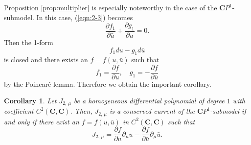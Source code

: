\documentclass[makeidx,12pt,openany]{report}
\newtheorem{cor}[df]{Corollary}
\begin{document}
Proposition \ref{prop:multiplier} is especially noteworthy 
in the case of the ${\mathbf{C}}P^1$-submodel. In this case, 
(\ref{eqn:2-3}) becomes 
$$
 \frac{\partial f_1}{\partial \bar{u}}+\frac{\partial g_1}{\partial u}=0. 
$$
Then the 1-form 
$$
f_1 du-g_1 d\bar{u}
$$
is closed and there exists an $f=f(u,\bar{u})$ such that 
$$
 f_1=\frac{\partial f}{\partial u}, \quad
 g_1=-\frac{\partial f}{\partial \bar{u}}
$$
by the Poincar\'e lemma. Therefore we obtain the important corollary. 
\begin{cor}\label{cor:important}
Let $J_{2,\, \mu}$ be a homogeneous differential polynomial 
of degree $1$ with coefficient $C^2({\mathbf{C}},{\mathbf{C}})$. 
Then, $J_{2,\, \mu}$ is a conserved current of the ${\mathbf{C}}P^1$-submodel 
if and only if 
there exist an $f=f(u,\bar{u})$ in $C^2({\mathbf{C}},{\mathbf{C}})$ such that 
\begin{equation}
  J_{2,\, \mu}=\frac{\partial f}{\partial u}\partial_{\mu}u 
   -\frac{\partial f}{\partial \bar{u}}\partial_{\mu}\bar{u}. 
 \label{eqn:2-7}
\end{equation}
\end{cor}
\end{document}
